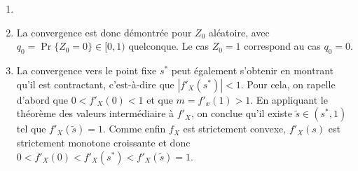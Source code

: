 \remarks
\begin{enumerate}
  \item{}
  \item La convergence est donc démontrée pour $Z_0$ aléatoire, avec $q_0 = \Pr\{Z_0 = 0\} \in [0, 1)$ quelconque. Le cas $Z_0 = 1$ correspond au cas $q_0 = 0$.
  \item La convergence vers le point fixe $s^*$ peut également s'obtenir en montrant qu'il est contractant, c'est-à-dire que $|f'_X(s^*)| < 1$. Pour cela, on rapelle d'abord que $0 < f'_X(0) < 1$ et que $m = f'_x(1) > 1$. En appliquant le théorème des valeurs intermédiaire à $f'_X$, on conclue qu'il existe $\widetilde{s} \in (s^*, 1)$ tel que $f'_X(\widetilde{s}) = 1$. Comme enfin $f_X$ est strictement convexe, $f'_X(s)$ est strictement monotone croissante et donc $0 < f'_X(0) < f'_X(s^*) < f'_X(\widetilde{s}) = 1$.
\end{enumerate}


